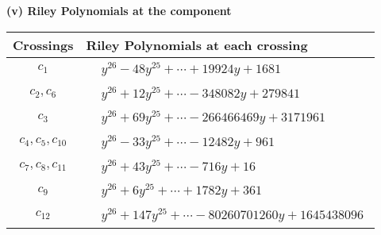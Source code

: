 \documentclass[1p]{elsarticle_modified}
\theoremstyle{definition}
\begin{document}
\flushleft \textbf{(v) Riley Polynomials at the component}\newline \\
\begin{tabular}{m{50pt}|m{274pt}}
Crossings & \hspace{64pt}Riley Polynomials at each crossing \\
\hline $$\begin{aligned}c_{1}\end{aligned}$$&$\begin{aligned}
&y^{26}-48 y^{25}+\cdots+19924 y+1681
\end{aligned}$\\
\hline $$\begin{aligned}c_{2},c_{6}\end{aligned}$$&$\begin{aligned}
&y^{26}+12 y^{25}+\cdots-348082 y+279841
\end{aligned}$\\
\hline $$\begin{aligned}c_{3}\end{aligned}$$&$\begin{aligned}
&y^{26}+69 y^{25}+\cdots-266466469 y+3171961
\end{aligned}$\\
\hline $$\begin{aligned}c_{4},c_{5},c_{10}\end{aligned}$$&$\begin{aligned}
&y^{26}-33 y^{25}+\cdots-12482 y+961
\end{aligned}$\\
\hline $$\begin{aligned}c_{7},c_{8},c_{11}\end{aligned}$$&$\begin{aligned}
&y^{26}+43 y^{25}+\cdots-716 y+16
\end{aligned}$\\
\hline $$\begin{aligned}c_{9}\end{aligned}$$&$\begin{aligned}
&y^{26}+6 y^{25}+\cdots+1782 y+361
\end{aligned}$\\
\hline $$\begin{aligned}c_{12}\end{aligned}$$&$\begin{aligned}
&y^{26}+147 y^{25}+\cdots-80260701260 y+1645438096
\end{aligned}$\\
\hline
\end{tabular}\\~\\
\end{document}
